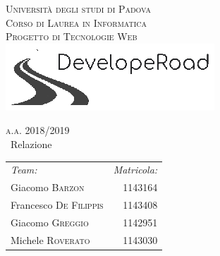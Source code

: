 \begin{titlepage} %
	\begin{center} %

		
		\textsc{\LARGE Università degli studi di Padova}\\[1.5cm]
		
		\textsc{\Large Corso di Laurea in Informatica}\\[0.5cm]
		
		\textsc{\Large Progetto di Tecnologie Web}\\[0.5cm]
		
		\includegraphics[scale=1.5]{img/logoFinal.eps}
		
		\textsc{\large a.a. 2018/2019}\\[0.5cm] %
		
		
		{\huge\ Relazione}\\[0.4cm] %
		
		
	 	\large
			\begin{tabular}{l r}
				\emph{Team:} & \emph{Matricola:} \\
				Giacomo \textsc{Barzon} & 1143164 \\
				Francesco \textsc{De Filippis} & 1143408 \\
				Giacomo \textsc{Greggio} & 1142951 \\
				Michele \textsc{Roverato} & 1143030 \\
			\end{tabular}
	\end{center}
\end{titlepage}

